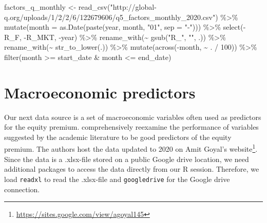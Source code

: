 \documentclass[
]{krantz}
\newenvironment{Shaded}{\begin{snugshade}}{\end{snugshade}}
\newcommand{\AttributeTok}[1]{\textcolor[rgb]{0.61,0.61,0.61}{#1}}
\newcommand{\DecValTok}[1]{\textcolor[rgb]{0.06,0.06,0.06}{#1}}
\newcommand{\FunctionTok}[1]{\textcolor[rgb]{0,0,0}{#1}}
\newcommand{\NormalTok}[1]{#1}
\newcommand{\OtherTok}[1]{\textcolor[rgb]{0.37,0.37,0.37}{#1}}
\newcommand{\SpecialCharTok}[1]{\textcolor[rgb]{0,0,0}{#1}}
\newcommand{\StringTok}[1]{\textcolor[rgb]{0.5,0.5,0.5}{#1}}
\renewcommand{\href}[2]{#2\footnote{\url{#1}}}
\begin{document}
\begin{Shaded}
\begin{Highlighting}[]
\NormalTok{factors\_q\_monthly }\OtherTok{\textless{}{-}} \FunctionTok{read\_csv}\NormalTok{(}\StringTok{"http://global{-}q.org/uploads/1/2/2/6/122679606/q5\_factors\_monthly\_2020.csv"}\NormalTok{) }\SpecialCharTok{\%\textgreater{}\%}
  \FunctionTok{mutate}\NormalTok{(}\AttributeTok{month =} \FunctionTok{as.Date}\NormalTok{(}\FunctionTok{paste}\NormalTok{(year, month, }\StringTok{"01"}\NormalTok{, }\AttributeTok{sep =} \StringTok{"{-}"}\NormalTok{))) }\SpecialCharTok{\%\textgreater{}\%}
  \FunctionTok{select}\NormalTok{(}\SpecialCharTok{{-}}\NormalTok{R\_F, }\SpecialCharTok{{-}}\NormalTok{R\_MKT, }\SpecialCharTok{{-}}\NormalTok{year) }\SpecialCharTok{\%\textgreater{}\%}
  \FunctionTok{rename\_with}\NormalTok{(}\SpecialCharTok{\textasciitilde{}} \FunctionTok{gsub}\NormalTok{(}\StringTok{"R\_"}\NormalTok{, }\StringTok{""}\NormalTok{, .)) }\SpecialCharTok{\%\textgreater{}\%}
  \FunctionTok{rename\_with}\NormalTok{(}\SpecialCharTok{\textasciitilde{}} \FunctionTok{str\_to\_lower}\NormalTok{(.)) }\SpecialCharTok{\%\textgreater{}\%}
  \FunctionTok{mutate}\NormalTok{(}\FunctionTok{across}\NormalTok{(}\SpecialCharTok{{-}}\NormalTok{month, }\SpecialCharTok{\textasciitilde{}}\NormalTok{ . }\SpecialCharTok{/} \DecValTok{100}\NormalTok{)) }\SpecialCharTok{\%\textgreater{}\%}
  \FunctionTok{filter}\NormalTok{(month }\SpecialCharTok{\textgreater{}=}\NormalTok{ start\_date }\SpecialCharTok{\&}\NormalTok{ month }\SpecialCharTok{\textless{}=}\NormalTok{ end\_date)}
\end{Highlighting}
\end{Shaded}

\hypertarget{macroeconomic-predictors}{%
\section{Macroeconomic predictors}\label{macroeconomic-predictors}}

Our next data source is a set of macroeconomic variables often used as predictors for the equity premium. \citep{Goyal2008} comprehensively reexamine the performance of variables suggested by the academic literature to be good predictors of the equity premium. The authors host the data updated to 2020 on \href{https://sites.google.com/view/agoyal145}{Amit Goyal's website}. Since the data is a .xlsx-file stored on a public Google drive location, we need additional packages to access the data directly from our R session. Therefore, we load \texttt{readxl} to read the .xlsx-file and \texttt{googledrive} for the Google drive connection.
\end{document}
